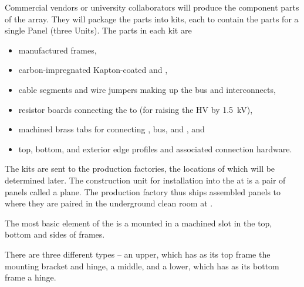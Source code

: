 Commercial vendors or university collaborators will produce the component parts of the  array. 
They will package the parts into kits, each to contain the parts for a single  Panel (three  Units). The parts in each kit are 
\begin{itemize}
\item manufactured \frfour {} frames, %
\item carbon-impregnated Kapton-coated  and ,
\item {} cable segments and wire jumpers making up the   bus and  interconnects,
\item resistor boards connecting the  to  (for raising the  HV by \SI{1.5}{\kV}),
\item machined brass tabs for connecting ,  bus, and , and
\item top, bottom, and exterior edge profiles and associated connection hardware.
\end{itemize}
The kits are sent to the production factories, the locations of which will be determined later.  
The %
 construction unit for installation into the  at \surf is a pair of  panels called a  plane. The production factory thus ships assembled  panels to \surf where they are paired in the underground clean room at \surf{}. %

The most basic element of the  
is a  mounted in a machined slot in the top, bottom and sides of \frfour frames.  



There are three different  types  -- an upper, which has as its top frame the  mounting bracket and  hinge, a middle, and a lower, which has as its bottom frame a  hinge.  

